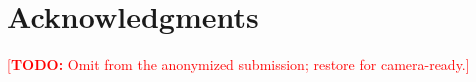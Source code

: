 \documentclass[10pt,twocolumn,letterpaper]{article}
\newcommand{\todo}[1]{\textcolor{red}{[\textbf{TODO:} #1]}}
\begin{document}
\section*{Acknowledgments}
\todo{Omit from the anonymized submission; restore for camera-ready.}




%
%



% 
\end{document}
